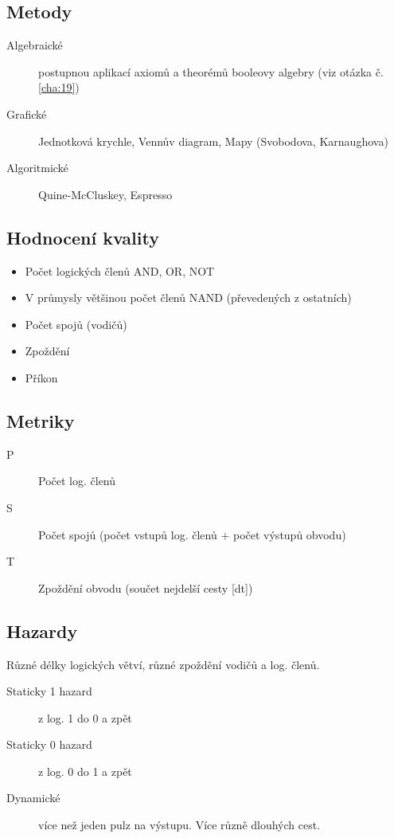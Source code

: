 \documentclass[a4paper, 11pt]{report}
\begin{document}
\subsection{Metody}

\begin{description}
	\item[Algebraické] postupnou aplikací axiomů a theorémů booleovy algebry (viz otázka č. \ref{cha:19})
	\item[Grafické] Jednotková krychle, Vennův diagram, Mapy (Svobodova, Karnaughova)
	\item[Algoritmické] Quine-McCluskey, Espresso
\end{description}

\subsection{Hodnocení kvality}
\begin{itemize}
	\item Počet logických členů AND, OR, NOT
	\item V průmysly většinou počet členů NAND (převedených z ostatních)
	\item Počet spojů (vodičů)
	\item Zpoždění
	\item Příkon
\end{itemize}

\subsection{Metriky}
\begin{description}
	\item[P] Počet log. členů
	\item[S] Počet spojů (počet vstupů log. členů + počet výstupů obvodu)
	\item[T] Zpoždění obvodu (součet nejdelší cesty [dt])
\end{description}

\subsection{Hazardy}
Různé délky logických větví, různé zpoždění vodičů a log. členů.

\begin{description}
	\item[Staticky 1 hazard] z log. 1 do 0 a zpět
	\item[Staticky 0 hazard] z log. 0 do 1 a zpět
	\item[Dynamické] více než jeden pulz na výstupu. Více různě dlouhých cest.
\end{description}
\end{document}
